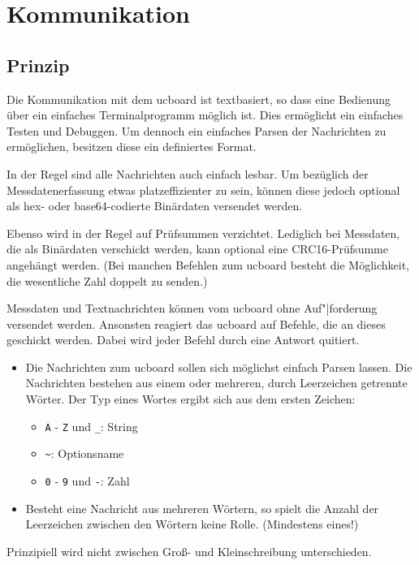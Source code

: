 
\chapter{Kommunikation}


\section{Prinzip}

Die Kommunikation mit dem ucboard ist textbasiert, so dass eine Bedienung über ein einfaches Terminalprogramm möglich ist. Dies ermöglicht ein einfaches Testen und Debuggen. Um dennoch ein einfaches Parsen der Nachrichten zu ermöglichen, besitzen diese ein definiertes Format.

In der Regel sind alle Nachrichten auch einfach lesbar. Um bezüglich der Messdatenerfassung etwas platzeffizienter zu sein, können diese jedoch optional als hex- oder base64-codierte Binärdaten versendet werden.

Ebenso wird in der Regel auf Prüfsummen verzichtet. Lediglich bei Messdaten, die als Binärdaten verschickt werden, kann optional eine CRC16-Prüfsumme angehängt werden. (Bei manchen Befehlen zum ucboard besteht die Möglichkeit, die wesentliche Zahl doppelt zu senden.)

Messdaten und Textnachrichten können vom ucboard ohne Auf"|forderung versendet werden. Ansonsten reagiert das ucboard auf Befehle, die an dieses geschickt werden. Dabei wird jeder Befehl durch eine Antwort quitiert.

\begin{itemize}
	\item Die Nachrichten zum ucboard sollen sich möglichst einfach Parsen lassen. Die Nachrichten bestehen aus einem oder mehreren, durch Leerzeichen getrennte Wörter. Der Typ eines Wortes ergibt sich aus dem ersten Zeichen:
		\begin{itemize}
			\item \texttt{A} - \texttt{Z} und \texttt{\_}: String
			\item \verb+~+: Optionsname
			\item \texttt{0} - \texttt{9} und \texttt{-}: Zahl
		\end{itemize}
	\item Besteht eine Nachricht aus mehreren Wörtern, so spielt die Anzahl der Leerzeichen zwischen den Wörtern keine Rolle. (Mindestens eines!)
\end{itemize}

Prinzipiell wird nicht zwischen Groß- und Kleinschreibung unterschieden.

